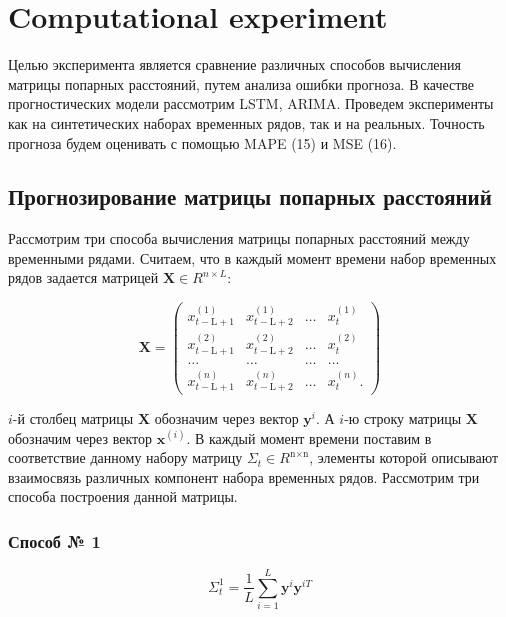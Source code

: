 \documentclass{article}
\begin{document}
\section{Computational experiment}

Целью эксперимента является сравнение различных способов вычисления матрицы попарных расстояний, путем анализа ошибки прогноза. В качестве прогностических модели рассмотрим LSTM, ARIMA. Проведем эксперименты как на синтетических наборах временных рядов, так и на реальных. Точность прогноза будем оценивать с помощью MAPE (15) и MSE (16). 

\subsection{Прогнозирование матрицы попарных расстояний}

Рассмотрим три способа вычисления матрицы попарных расстояний между временными рядами. Считаем, что в каждый момент времени набор временных рядов задается матрицей $\textbf{X} \in R^{n \times L}$:


\begin{equation}
\textbf{X} = \left( \begin{array}{cccc}
x^{(1)}_{t - \text{L} + 1} & x^{(1)}_{t - \text{L} + 2} & \ldots & x^{(1)}_{t} \\
x^{(2)}_{t - \text{L} + 1} & x^{(2)}_{t - \text{L} + 2} & \ldots & x^{(2)}_{t} \\
\ldots & \ldots & \ldots & \ldots \\
x^{(n)}_{t - \text{L} + 1} & x^{(n)}_{t - \text{L} + 2} & \ldots & x^{(n)}_{t}.
\end{array}\right)
\end{equation}


$i$-й столбец матрицы $\textbf{X}$ обозначим через вектор $\textbf{y}^{i}$. А $i$-ю строку матрицы $\textbf{X}$ обозначим через вектор $\textbf{x}^{(i)}$.   В каждый момент времени поставим в соответствие данному набору матрицу $\Sigma_t \in R^{\text{n} \times \text{n}}$, элементы которой описывают взаимосвязь различных компонент набора временных рядов. Рассмотрим три способа построения данной матрицы.

\subsubsection{Способ № 1}


\begin{equation}
\Sigma_t^{1} = \dfrac{1}{L}\sum\limits_{i = 1}^{L} \textbf{y}^{i} \textbf{y}^{iT}
\end{equation}
\end{document}
